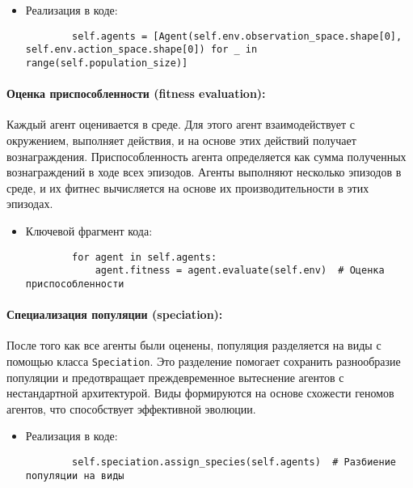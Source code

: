 \documentclass[a4paper,12pt]{article}
\begin{document}
\begin{itemize}
	\item[] Реализация в коде:
	\begin{lstlisting}
		self.agents = [Agent(self.env.observation_space.shape[0], self.env.action_space.shape[0]) for _ in range(self.population_size)]
	\end{lstlisting}
\end{itemize}

\paragraph{Оценка приспособленности (fitness evaluation):}

Каждый агент оценивается в среде. Для этого агент взаимодействует с окружением, выполняет действия, и на основе этих действий получает вознаграждения. Приспособленность агента определяется как сумма полученных вознаграждений в ходе всех эпизодов. Агенты выполняют несколько эпизодов в среде, и их фитнес вычисляется на основе их производительности в этих эпизодах.

\begin{itemize}
	\item[] Ключевой фрагмент кода:
	\begin{lstlisting}
		for agent in self.agents:
			agent.fitness = agent.evaluate(self.env)  # Оценка приспособленности
	\end{lstlisting}
\end{itemize}

\paragraph{Специализация популяции (speciation):}

После того как все агенты были оценены, популяция разделяется на виды с помощью класса \texttt{Speciation}. Это разделение помогает сохранить разнообразие популяции и предотвращает преждевременное вытеснение агентов с нестандартной архитектурой. Виды формируются на основе схожести геномов агентов, что способствует эффективной эволюции.

\begin{itemize}
	\item[] Реализация в коде:
	\begin{lstlisting}
		self.speciation.assign_species(self.agents)  # Разбиение популяции на виды
	\end{lstlisting}
\end{itemize}
\end{document}
